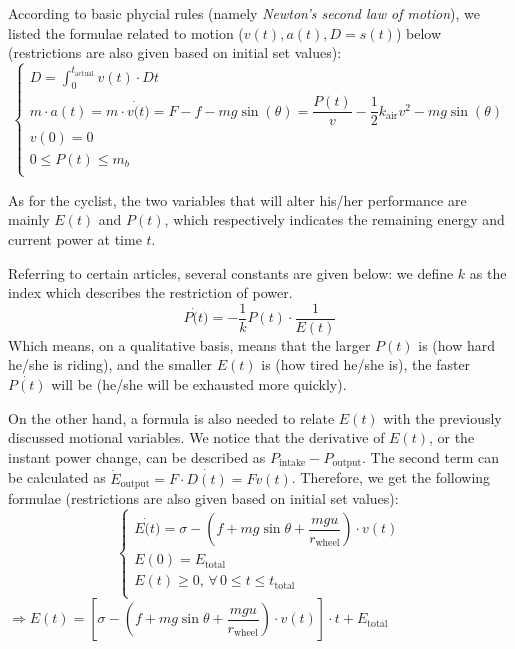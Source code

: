 \documentclass{article}
\begin{document}
\begin{itemize}
					According to basic phycial rules (namely \textit{Newton's second law of motion}), we listed the formulae related to motion (\(v\left( t \right) ,a\left( t \right) ,D=s\left( t \right) \)) below (restrictions are also given based on initial set values):
					$$
					\begin{cases}
						\displaystyle
						D=\int^{t_\mathrm{actual}}_0 v(t)\cdot  D t\\
						m \cdot  a (t)=m \cdot v\dot(t)=F-f-mg\sin\left(\theta\right)=\dfrac{P (t)}{v}-\dfrac{1}{2} k_{\mathrm{air}} v^2-mg\sin\left(\theta\right)\\
						v(0)=0\\
						0\leq P (t)\leq m_ b\\
					\end{cases}
					$$

					As for the cyclist, the two variables that will alter his/her performance are mainly \(E(t)\) and \(P(t)\), which respectively indicates the remaining energy and current power at time \(t\).

					Referring to certain articles\cite{114514}, several constants are given below: we define $k$ as the index which describes the restriction of power.
					\[P \dot(t)=-\dfrac{1}{ k } P (t) \cdot \dfrac{1}{ E (t)}\]
					Which means, on a qualitative basis, means that the larger \(P(t)\) is (how hard he/she is riding), and the smaller \(E(t)\) is (how tired he/she is), the faster \(\dot{P(t)}\) will be (he/she will be exhausted more quickly).

					On the other hand, a formula is also needed to relate \(E(t)\) with the previously discussed motional variables. We notice that the derivative of \(E(t)\), or the instant power change, can be described as \(P_{\mathrm{intake}} - P_{\mathrm{output}}\). The second term can be calculated as \(\dot{E}_{\mathrm{output}}=F\cdot \dot{D\left( t \right)} =Fv\left( t \right) \). Therefore, we get the following formulae (restrictions are also given based on initial set values):
					$$
					\begin{cases}
						\displaystyle
						E \dot(t)=\sigma-\left(f+mg\sin\theta+\dfrac{mgu}{r_{\mathrm{wheel}}}\right)\cdot v(t) \\
						E (0)= E _\mathrm{total} \\
						E (t)\geq0,\, \forall\,0 \leq t \leq t_\mathrm{total} \\
					\end{cases}
					$$
					\(\Rightarrow E (t)=\left[\sigma-\left(f+mg\sin \theta +\dfrac{mgu}{r_{\mathrm{wheel}}} \right)\cdot v(t)\right]\cdot t+ E _\mathrm{total}\)


\end{itemize}
\end{document}
